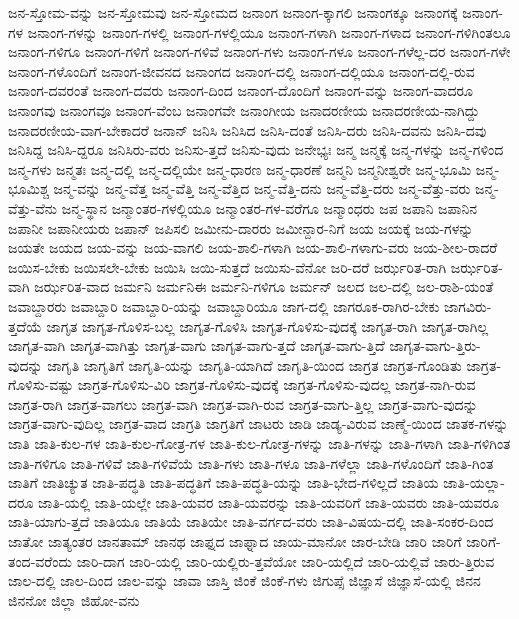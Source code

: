 {ಜನ-ಸ್ತೋಮ-ವನ್ನು
ಜನ-ಸ್ತೋಮವು
ಜನ-ಸ್ತೋಮದ
ಜನಾಂಗ
ಜನಾಂಗ-ಕ್ಕಾಗಲಿ
ಜನಾಂಗಕ್ಕೂ
ಜನಾಂಗಕ್ಕೆ
ಜನಾಂಗ-ಗಳ
ಜನಾಂಗ-ಗಳನ್ನು
ಜನಾಂಗ-ಗಳಲ್ಲಿ
ಜನಾಂಗ-ಗಳಲ್ಲಿಯೂ
ಜನಾಂಗ-ಗಳಾಗಿ
ಜನಾಂಗ-ಗಳಾದ
ಜನಾಂಗ-ಗಳಿಗಿಂತಲೂ
ಜನಾಂಗ-ಗಳಿಗೂ
ಜನಾಂಗ-ಗಳಿಗೆ
ಜನಾಂಗ-ಗಳಿವೆ
ಜನಾಂಗ-ಗಳು
ಜನಾಂಗ-ಗಳೂ
ಜನಾಂಗ-ಗಳೆಲ್ಲ-ದರ
ಜನಾಂಗ-ಗಳೇ
ಜನಾಂಗ-ಗಳೊಂದಿಗೆ
ಜನಾಂಗ-ಜೀವನದ
ಜನಾಂಗದ
ಜನಾಂಗ-ದಲ್ಲಿ
ಜನಾಂಗ-ದಲ್ಲಿಯೂ
ಜನಾಂಗ-ದಲ್ಲಿ-ರುವ
ಜನಾಂಗ-ದವರಂತೆ
ಜನಾಂಗ-ದವರು
ಜನಾಂಗ-ದಿಂದ
ಜನಾಂಗ-ದೊಂದಿಗೆ
ಜನಾಂಗ-ವನ್ನು
ಜನಾಂಗ-ವಾದರೂ
ಜನಾಂಗವು
ಜನಾಂಗವೂ
ಜನಾಂಗ-ವೆಂಬ
ಜನಾಂಗವೇ
ಜನಾಂಗೀಯ
ಜನಾದರಣೀಯ
ಜನಾದರಣೀಯ-ನಾಗಿದ್ದು
ಜನಾದರಣೀಯ-ವಾಗ-ಬೇಕಾದರೆ
ಜನಾನ್
ಜನಿಸಿ
ಜನಿಸಿದ
ಜನಿಸಿ-ದಂತೆ
ಜನಿಸಿ-ದರು
ಜನಿಸಿ-ದವನು
ಜನಿಸಿ-ದವು
ಜನಿಸಿದ್ದ
ಜನಿಸಿ-ದ್ದರೂ
ಜನಿಸಿರು-ವರು
ಜನಿಸು-ತ್ತದೆ
ಜನಿಸು-ವುದು
ಜನೇಭ್ಯಃ
ಜನ್ಮ
ಜನ್ಮಕ್ಕೆ
ಜನ್ಮ-ಗಳನ್ನು
ಜನ್ಮ-ಗಳಿಂದ
ಜನ್ಮ-ಗಳು
ಜನ್ಮತಃ
ಜನ್ಮ-ದಲ್ಲಿ
ಜನ್ಮ-ದಲ್ಲಿಯೇ
ಜನ್ಮ-ಧಾರಣ
ಜನ್ಮ-ಧಾರಣೆ
ಜನ್ಮನಿ
ಜನ್ಮನೀಶ್ವರೇ
ಜನ್ಮ-ಭೂಮಿ
ಜನ್ಮ-ಭೂಮಿಶ್ಚ
ಜನ್ಮ-ವನ್ನು
ಜನ್ಮ-ವೆತ್ತ
ಜನ್ಮ-ವೆತ್ತಿ
ಜನ್ಮ-ವೆತ್ತಿದ
ಜನ್ಮ-ವೆತ್ತಿ-ದನು
ಜನ್ಮ-ವೆತ್ತಿ-ದರು
ಜನ್ಮ-ವೆತ್ತು-ವರು
ಜನ್ಮ-ವೆತ್ತು-ವೆನು
ಜನ್ಮ-ಸ್ಥಾನ
ಜನ್ಮಾಂತರ-ಗಳಲ್ಲಿಯೂ
ಜನ್ಮಾಂತರ-ಗಳ-ವರೆಗೂ
ಜನ್ಮಾಂಧರು
ಜಪ
ಜಪಾನಿ
ಜಪಾನಿನ
ಜಪಾನೀ
ಜಪಾನೀಯರು
ಜಪಾನ್
ಜಪಿಸಲಿ
ಜಮೀನು-ದಾರರು
ಜಮೀನ್ದಾರ-ನಿಗೆ
ಜಯ
ಜಯಕ್ಕೆ
ಜಯ-ಗಳನ್ನು
ಜಯತೇ
ಜಯದ
ಜಯ-ವನ್ನು
ಜಯ-ವಾಗಲಿ
ಜಯ-ಶಾಲಿ-ಗಳಾಗಿ
ಜಯ-ಶಾಲಿ-ಗಳಾಗು-ವರು
ಜಯ-ಶೀಲ-ರಾದರೆ
ಜಯಿಸ-ಬೇಕು
ಜಯಿಸಲೇ-ಬೇಕು
ಜಯಿಸಿ
ಜಯಿ-ಸುತ್ತದೆ
ಜಯಿಸು-ವೆನೋ
ಜರಿ-ದರೆ
ಜರ್ಝರಿತ-ರಾಗಿ
ಜರ್ಝರಿತ-ವಾಗಿ
ಜರ್ಝರಿತ-ವಾದ
ಜರ್ಮನಿ
ಜರ್ಮನಿಈ
ಜರ್ಮನಿ-ಗಳಿಗೂ
ಜರ್ಮನ್
ಜಲದ
ಜಲ-ದಲ್ಲಿ
ಜಲ-ರಾಶಿ-ಯಂತೆ
ಜವಾಬ್ದಾರರು
ಜವಾಬ್ದಾರಿ
ಜವಾಬ್ದಾರಿ-ಯನ್ನು
ಜವಾಬ್ದಾರಿಯೂ
ಜಾಗ-ದಲ್ಲಿ
ಜಾಗರೂಕ-ರಾಗಿರ-ಬೇಕು
ಜಾಗವಿರು-ತ್ತದೆಯೆ
ಜಾಗೃತ
ಜಾಗೃತ-ಗೊಳಿಸ-ಬಲ್ಲ
ಜಾಗೃತ-ಗೊಳಿಸಿ
ಜಾಗೃತ-ಗೊಳಿಸು-ವುದಕ್ಕೆ
ಜಾಗೃತ-ರಾಗಿ
ಜಾಗೃತ-ರಾಗಿಲ್ಲ
ಜಾಗೃತ-ವಾಗಿ
ಜಾಗೃತ-ವಾಗಿತ್ತು
ಜಾಗೃತ-ವಾಗು
ಜಾಗೃತ-ವಾಗು-ತ್ತದೆ
ಜಾಗೃತ-ವಾಗು-ತ್ತಿದೆ
ಜಾಗೃತ-ವಾಗು-ತ್ತಿರು-ವುದನ್ನು
ಜಾಗೃತಿ
ಜಾಗೃತಿಗೆ
ಜಾಗೃತಿ-ಯನ್ನು
ಜಾಗೃತಿ-ಯಾಗಿದೆ
ಜಾಗೃತಿ-ಯಿಂದ
ಜಾಗ್ರತ
ಜಾಗ್ರತ-ಗೊಂಡಿತು
ಜಾಗ್ರತ-ಗೊಳಿಸು-ವಷ್ಟು
ಜಾಗ್ರತ-ಗೊಳಿಸು-ವಿರಿ
ಜಾಗ್ರತ-ಗೊಳಿಸು-ವುದಕ್ಕೆ
ಜಾಗ್ರತ-ಗೊಳಿಸು-ವುದಲ್ಲ
ಜಾಗ್ರತ-ನಾಗಿ-ರುವ
ಜಾಗ್ರತ-ರಾಗಿ
ಜಾಗ್ರತ-ವಾಗಲು
ಜಾಗ್ರತ-ವಾಗಿ
ಜಾಗ್ರತ-ವಾಗಿ-ರುವ
ಜಾಗ್ರತ-ವಾಗು-ತ್ತಿಲ್ಲ
ಜಾಗ್ರತ-ವಾಗು-ವುದನ್ನು
ಜಾಗ್ರತ-ವಾಗು-ವುದಿಲ್ಲ
ಜಾಗ್ರತ-ವಾದ
ಜಾಗ್ರತಿ
ಜಾಗ್ರತಿಗೆ
ಜಾಟರು
ಜಾಡಿ
ಜಾಡ್ಯ-ವಿರುವ
ಜಾಣ್ಮೆ-ಯಿಂದ
ಜಾತಕ-ಗಳನ್ನು
ಜಾತಿ
ಜಾತಿ-ಕುಲ-ಗಳ
ಜಾತಿ-ಕುಲ-ಗೋತ್ರ-ಗಳ
ಜಾತಿ-ಕುಲ-ಗೋತ್ರ-ಗಳನ್ನು
ಜಾತಿ-ಗಳನ್ನು
ಜಾತಿ-ಗಳಾಗಿ
ಜಾತಿ-ಗಳಿಗಿಂತ
ಜಾತಿ-ಗಳಿಗೂ
ಜಾತಿ-ಗಳಿವೆ
ಜಾತಿ-ಗಳಿವೆಯೆ
ಜಾತಿ-ಗಳು
ಜಾತಿ-ಗಳೂ
ಜಾತಿ-ಗಳೆಲ್ಲಾ
ಜಾತಿ-ಗಳೊಂದಿಗೆ
ಜಾತಿ-ಗಿಂತ
ಜಾತಿಗೆ
ಜಾತಿಚ್ಯುತ
ಜಾತಿ-ಪದ್ಧತಿ
ಜಾತಿ-ಪದ್ಧತಿಗೆ
ಜಾತಿ-ಪದ್ಧತಿ-ಯನ್ನು
ಜಾತಿ-ಭೇದ-ಗಳಿಲ್ಲದೆ
ಜಾತಿಯ
ಜಾತಿ-ಯಲ್ಲಾ-ದರೂ
ಜಾತಿ-ಯಲ್ಲಿ
ಜಾತಿ-ಯಲ್ಲೇ
ಜಾತಿ-ಯವರ
ಜಾತಿ-ಯವರನ್ನು
ಜಾತಿ-ಯವರಿಗೆ
ಜಾತಿ-ಯವರು
ಜಾತಿ-ಯವರೂ
ಜಾತಿ-ಯಾಗು-ತ್ತದೆ
ಜಾತಿಯೂ
ಜಾತಿಯೆ
ಜಾತಿಯೇ
ಜಾತಿ-ವರ್ಗದ-ವರು
ಜಾತಿ-ವಿಷಯ-ದಲ್ಲಿ
ಜಾತಿ-ಸಂಕರ-ದಿಂದ
ಜಾತೋ
ಜಾತ್ಯಂತರ
ಜಾನತಾಮ್
ಜಾನಥ
ಜಾಫ್ನದ
ಜಾಫ್ನಾದ
ಜಾಯ-ಮಾನೋ
ಜಾರ-ಬೇಡಿ
ಜಾರಿ
ಜಾರಿಗೆ
ಜಾರಿಗೆ-ತಂದ-ವರೆಂದು
ಜಾರಿ-ದಾಗ
ಜಾರಿ-ಯಲ್ಲಿ
ಜಾರಿ-ಯಲ್ಲಿರು-ತ್ತವೆಯೋ
ಜಾರಿ-ಯಲ್ಲಿದೆ
ಜಾರಿ-ಯಲ್ಲಿವೆ
ಜಾರು-ತ್ತಿರುವ
ಜಾಲ-ದಲ್ಲಿ
ಜಾಲ-ದಿಂದ
ಜಾಲ-ವನ್ನು
ಜಾವಾ
ಜಾಸ್ತಿ
ಜಿಂಕೆ
ಜಿಂಕೆ-ಗಳು
ಜಿಗುಪ್ಸೆ
ಜಿಜ್ಞಾಸೆ
ಜಿಜ್ಞಾಸೆ-ಯಲ್ಲಿ
ಜಿನನ
ಜಿನನೋ
ಜಿಲ್ಲಾ
ಜಿಹೋ-ವನು
}
